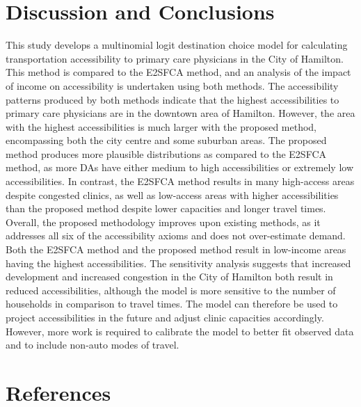 \documentclass{article}
\begin{document}
\hypertarget{discussion-and-conclusions}{%
\section{Discussion and Conclusions}\label{discussion-and-conclusions}}

This study develops a multinomial logit destination choice model for
calculating transportation accessibility to primary care physicians in
the City of Hamilton. This method is compared to the E2SFCA method, and
an analysis of the impact of income on accessibility is undertaken using
both methods. The accessibility patterns produced by both methods
indicate that the highest accessibilities to primary care physicians are
in the downtown area of Hamilton. However, the area with the highest
accessibilities is much larger with the proposed method, encompassing
both the city centre and some suburban areas. The proposed method
produces more plausible distributions as compared to the E2SFCA method,
as more DAs have either medium to high accessibilities or extremely low
accessibilities. In contrast, the E2SFCA method results in many
high-access areas despite congested clinics, as well as low-access areas
with higher accessibilities than the proposed method despite lower
capacities and longer travel times. Overall, the proposed methodology
improves upon existing methods, as it addresses all six of the
accessibility axioms and does not over-estimate demand. Both the E2SFCA
method and the proposed method result in low-income areas having the
highest accessibilities. The sensitivity analysis suggests that
increased development and increased congestion in the City of Hamilton
both result in reduced accessibilities, although the model is more
sensitive to the number of households in comparison to travel times. The
model can therefore be used to project accessibilities in the future and
adjust clinic capacities accordingly. However, more work is required to
calibrate the model to better fit observed data and to include non-auto
modes of travel.

\hypertarget{references}{%
\section*{References}\label{references}}
\end{document}
